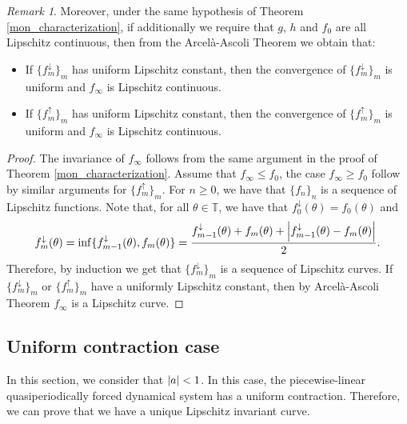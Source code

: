 \documentclass[12pt]{article}
\newcommand{\T}{\mathbb{T}}
\theoremstyle{plain}
\theoremstyle{remark}
\newtheorem{remark}[defn]{Remark}
\DeclarePairedDelimiter\abs{\lvert}{\rvert}
\theoremstyle{definition}
\begin{document}
\begin{remark}
    Moreover, under the same hypothesis of Theorem \ref{mon_characterization}, if additionally we require that $g$, $h$ and $f_0$ are all Lipschitz continuous, then from the Arcelà-Ascoli Theorem we obtain that:
    \begin{itemize}
        \item If $\{f_m^{\downarrow}\}_m$ has uniform Lipschitz constant, then the convergence of $\{f_m^{\downarrow}\}_m$ is uniform and $f_\infty$ is Lipschitz continuous.
        \item If $\{f_m^{\uparrow}\}_m$ has uniform Lipschitz constant, then the convergence of $\{f_m^{\uparrow}\}_m$ is uniform and $f_\infty$ is Lipschitz continuous.
    \end{itemize}
\end{remark}
\begin{proof}
    The invariance of $f_\infty$ follows from the same argument in the proof of Theorem \ref{mon_characterization}. Assume that $f_\infty\leq f_0$, the case $f_\infty\geq f_0$ follow by similar arguments for $\{f_m^{\uparrow}\}_m$. For $n\geq0$, we have that $\{f_n\}_n$ is a sequence of Lipschitz functions.
    Note that, for all $\theta\in\T$, we have that $f_0^{\downarrow}(\theta)=f_0(\theta)$ and
    \begin{align*}
        f_m^{\downarrow}(\theta)=\inf\{f_{m-1}^{\downarrow}(\theta), f_m(\theta)\}=\frac{f_{m-1}^{\downarrow}(\theta)+f_m(\theta)+\abs*{f_{m-1}^{\downarrow}(\theta)-f_m(\theta)}}{2}.
    \end{align*}
    Therefore, by induction we get that $\{f_m^{\downarrow}\}_m$ is a sequence of Lipschitz curves. If $\{f_m^{\downarrow}\}_m$ or $\{f_m^{\uparrow}\}_m$ have a uniformly Lipschitz constant, then by Arcelà-Ascoli Theorem $f_\infty$ is a Lipschitz curve.
\end{proof}

\subsection{Uniform contraction case}\label{one_inv_curv}
In this section, we consider that $\abs{a}<1$. In this case, the piecewise-linear quasiperiodically forced dynamical system has a uniform contraction. Therefore, we can prove that we have a unique Lipschitz invariant curve.
\end{document}
